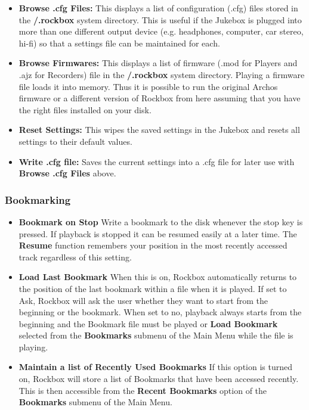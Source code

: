 \begin{itemize}
\begin{itemize}
\item \textbf{Browse .cfg Files: }
This displays a list of configuration
(.cfg) files stored in the \textbf{/.rockbox} system directory.  This
is useful if the Jukebox is plugged into more than one different output
device (e.g. headphones, computer, car stereo, hi{}-fi) so that a settings file can be maintained for each.
\item \textbf{Browse Firmwares:} This displays a list of firmware (.mod
for Players and .ajz for Recorders) file in the \textbf{/.rockbox} system directory. Playing a firmware file loads it into memory.  Thus it is possible to
run the original Archos firmware or a different version of Rockbox from
here assuming that you have the right files installed on your disk.
\item \textbf{Reset Settings: }This wipes the saved settings in the
Jukebox and resets all settings to their default values.
\item \textbf{Write .cfg file: }Saves the current settings into a .cfg
file for later use with \textbf{Browse .cfg Files} above.
\end{itemize}

\end{itemize}

\subsubsection{\label{ref:Bookmarkconfigactual}Bookmarking}

\begin{itemize}
\item \textbf{Bookmark on Stop}
Write a bookmark to the disk whenever the stop key is pressed.  If
playback is stopped it can be resumed easily at a later time. The
\textbf{Resume} function remembers your position in the most
recently accessed track regardless of this setting.
\item \textbf{Load Last Bookmark}
When this is on, Rockbox automatically returns to the position of the
last bookmark within a file when it is played.  If set to Ask, Rockbox
will ask the user whether they want to start from the beginning or the
bookmark.  When set to no, playback always starts from the beginning
and the Bookmark file must be played or \textbf{Load Bookmark} selected
from the \textbf{Bookmarks} submenu of the Main Menu while the file is
playing.
\item \textbf{Maintain a list of Recently Used Bookmarks}
If this option is turned on, Rockbox will store a list of Bookmarks that
have been accessed recently.  This is then accessible from the
\textbf{Recent Bookmarks} option of the \textbf{Bookmarks} submenu of
the Main Menu.
\end{itemize}

